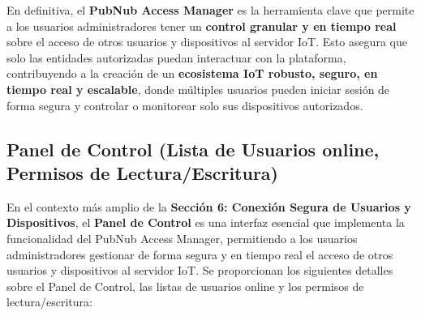 \documentclass{report}
\begin{document}
En definitiva, el \textbf{PubNub Access Manager} es la herramienta clave que permite a los usuarios administradores tener un \textbf{control granular 
y en tiempo real} sobre el acceso de otros usuarios y dispositivos al servidor IoT. Esto asegura que solo las entidades autorizadas puedan interactuar 
con la plataforma, contribuyendo a la creación de un \textbf{ecosistema IoT robusto, seguro, en tiempo real y escalable}, donde múltiples usuarios 
pueden iniciar sesión de forma segura y controlar o monitorear solo sus dispositivos autorizados.

\subsection{Panel de Control (Lista de Usuarios online, Permisos de Lectura/Escritura)}
En el contexto más amplio de la \textbf{Sección 6: Conexión Segura de Usuarios y Dispositivos}, el \textbf{Panel de Control} es una interfaz esencial 
que implementa la funcionalidad del PubNub Access Manager, permitiendo a los usuarios administradores gestionar de forma segura y en tiempo real el 
acceso de otros usuarios y dispositivos al servidor IoT. Se proporcionan los siguientes detalles sobre el Panel de Control, las listas de 
usuarios online y los permisos de lectura/escritura:
\end{document}
